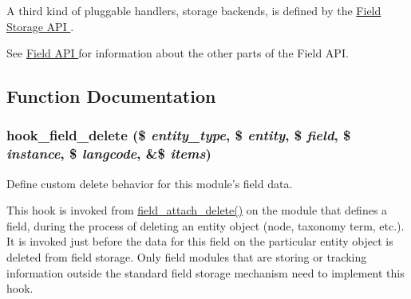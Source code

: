 A third kind of pluggable handlers, storage backends, is defined by the \hyperlink{group__field__storage}{Field Storage API }.

See \hyperlink{group__field}{Field API } for information about the other parts of the Field API. 

\subsection{Function Documentation}
\hypertarget{group__field__types_gaf1e5787044b83d34cf7daed3d5297336}{
\subsubsection[{hook\_\-field\_\-delete}]{\setlength{\rightskip}{0pt plus 5cm}hook\_\-field\_\-delete (\$ {\em entity\_\-type}, \/  \$ {\em entity}, \/  \$ {\em field}, \/  \$ {\em instance}, \/  \$ {\em langcode}, \/  \&\$ {\em items})}}
\label{group__field__types_gaf1e5787044b83d34cf7daed3d5297336}
Define custom delete behavior for this module's field data.

This hook is invoked from \hyperlink{group__field__attach_gac2e3658c9c02d0d0e71359f9ef2f207a}{field\_\-attach\_\-delete()} on the module that defines a field, during the process of deleting an entity object (node, taxonomy term, etc.). It is invoked just before the data for this field on the particular entity object is deleted from field storage. Only field modules that are storing or tracking information outside the standard field storage mechanism need to implement this hook.



